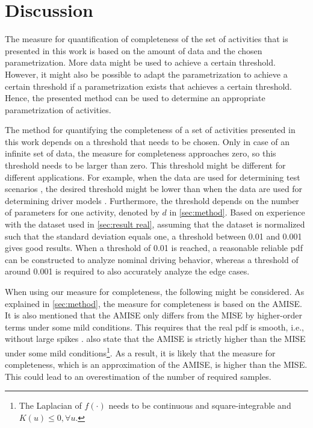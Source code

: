 \section{Discussion}
\label{sec:discussion}

The measure for quantification of completeness of the set of activities that is presented in this work is based on the amount of data and the chosen parametrization. More data might be used to achieve a certain threshold. However, it might also be possible to adapt the parametrization to achieve a certain threshold if a parametrization exists that achieves a certain threshold. Hence, the presented method can be used to determine an appropriate parametrization of activities.

The method for quantifying the completeness of a set of activities presented in this work depends on a threshold that needs to be chosen. \cstart Only in case of an infinite set of data, the measure for completeness approaches zero, so this threshold needs to be larger than zero. \cend This threshold might be different for different applications. For example, when the data are used for determining test scenarios \cite{elrofai2018scenario, ploeg2018cetran}, the desired threshold might be lower than when the data are used for determining driver models \cite{wang2017much, sadigh2014data}. \cstart Furthermore, the threshold depends on the number of parameters for one activity, denoted by $d$ in \cref{sec:method}. Based on experience with the dataset used in \cref{sec:result real}, assuming that the dataset is normalized such that the standard deviation equals one, a threshold between 0.01 and 0.001 gives good results. When a threshold of 0.01 is reached, a reasonable reliable pdf can be constructed to analyze nominal driving behavior, whereas a threshold of around 0.001 is required to also accurately analyze the edge cases. 
\cend

\cstart
When using our measure for completeness, the following might be considered. As explained in \cref{sec:method}, the measure for completeness is based on the AMISE. It is also mentioned that the AMISE only differs from the MISE by higher-order terms under some mild conditions. This requires that the real pdf is smooth, i.e., without large spikes \cite{marron1992exact}. \textcite{marron1992exact} also state that the AMISE is strictly higher than the MISE under some mild conditions\footnote{The Laplacian of $f(\cdot)$ needs to be continuous and square-integrable and $K(u) \leq 0, \forall u$.}. As a result, it is likely that the measure for completeness, which is an approximation of the AMISE, is higher than the MISE. This could lead to an overestimation of the number of required samples.
\cend

